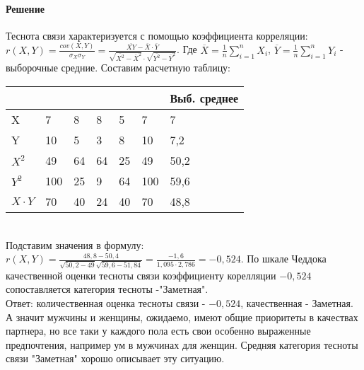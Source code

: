 \documentclass[a4paper, 12pt]{article}
\begin{document}
\paragraph{Решение}
Теснота связи характеризуется с помощью коэффициента корреляции: \\
$r(X,Y) = \frac{cov(X,Y)}{\sigma_X \sigma_Y} = \frac{\overline{XY} - \overline{X}\cdot \overline{Y}}{\sqrt{\overline{X^2} - \overline{X}^2}\cdot \sqrt{\overline{Y^2} - \overline{Y}^2}}$. Где $\overline{X} = \frac{1}{n} \sum\limits_{i=1}^n X_i$, $\overline{Y} = \frac{1}{n} \sum\limits_{i=1}^n Y_i$ - выборочные средние.
Составим расчетную таблицу:
\begin{minipage}{0.5\textwidth}
    \begin{center}
    \begin{tabular}{|l|l|l|l|l|l|l|}
    \hline
     &  & &  & & & Выб. среднее\\ \hline
    X & 7   & 8 & 8          & 5 & 7 &   7  \\ 
    \hline
    Y & 10   & 5  & 3          & 8 & 10 &   7,2  \\ 
    \hline
    $X^2$ & 49 &	64 &	64 &	25	& 49 & 50,2 \\
    \hline
    $Y^2$ & 100 &	25 &	9 &	64 &	100	&	59,6 \\
    \hline
    $X\cdot Y$ & 70 &	40 &	24 &	40 &	70	&	48,8 \\
    \hline
    \end{tabular}
    \label{table::no_lenses}
    \end{center}
\end{minipage}
\\
Подставим значения в формулу: 
$r(X,Y) = \frac{48,8 - 50,4}{\sqrt{50,2 - 49} \sqrt{59,6 - 51,84}} = \frac{-1,6}{1,095 \cdot 2,786} = -0,524$.
По шкале Чеддока качественной оценки тесноты связи коэффициенту корелляции $-0,524$ сопоставляется категория тесноты -"Заметная". \\
Ответ: количественная оценка тесноты связи - $-0,524$, качественная - Заметная. А значит мужчины и женщины, ожидаемо, имеют общие приоритеты в качествах партнера, но все таки у каждого пола есть свои особенно выраженные предпочтения, например ум в мужчинах для женщин. Средняя категория тесноты связи "Заметная" хорошо описывает эту ситуацию.
\end{document}
